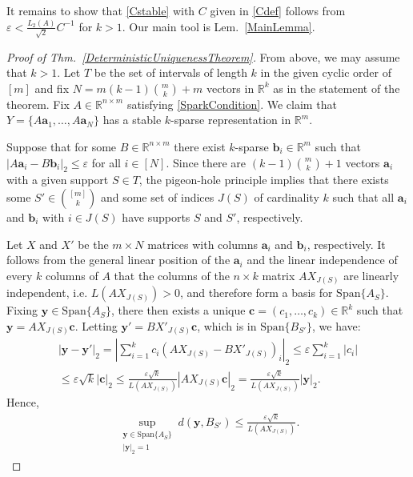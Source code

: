 \documentclass[journal, twocolumn]{IEEEtran}
\begin{document}
It remains to show that \eqref{Cstable} with $C$ given in \eqref{Cdef} follows from $\varepsilon < \frac{L_2(A)}{\sqrt{2}}C^{-1}$ for $k > 1$. Our main tool is Lem.~\ref{MainLemma}.

\begin{proof}[Proof of Thm.~\ref{DeterministicUniquenessTheorem}]
From above, we may assume that $k > 1$. Let $T$ be the set of intervals of length $k$ in the given cyclic order of $[m]$ and fix $N = m(k-1){m \choose k}+m$ vectors in $\mathbb{R}^k$ as in the statement of the theorem. Fix $A \in \mathbb{R}^{n \times m}$ satisfying \eqref{SparkCondition}. We claim that $Y = \{A\mathbf{a}_1, \ldots, A\mathbf{a}_N\}$ has a stable $k$-sparse representation in $\mathbb{R}^m$. 

Suppose that for some $B \in \mathbb{R}^{n \times m}$ there exist $k$-sparse $\mathbf{b}_i \in \mathbb{R}^m$ such that $|A\mathbf{a}_i - B\mathbf{b}_i|_2 \leq \varepsilon$ for all $i \in [N]$. Since there are $(k-1){m \choose k}+1$ vectors $\mathbf{a}_i$ with a given support $S \in T$, the pigeon-hole principle implies that there exists some $S' \in {[m] \choose k}$ and some set of indices $J(S)$ of cardinality $k$ such that all $\mathbf{a}_i$ and $\mathbf{b}_i$ with $i \in J(S)$ have supports $S$ and $S'$, respectively.

Let $X$ and $X'$ be the $m \times N$ matrices with columns $\mathbf{a}_i$ and $\mathbf{b}_i$, respectively. It follows from the general linear position of the $\mathbf{a}_i$ and the linear independence of every $k$ columns of $A$ that the columns of the $n \times k$ matrix $AX_{J(S)}$ are linearly independent, i.e. $L(AX_{J(S)}) > 0$, and therefore form a basis for $\text{Span}\{A_{S}\}$. Fixing $\mathbf{y} \in \text{Span}\{A_{S}\}$, there then exists a unique $\mathbf{c} = (c_1, \ldots, c_k) \in \mathbb{R}^k$ such that $\mathbf{y} = AX_{J(S)}\mathbf{c}$. Letting $\mathbf{y'} = BX'_{J(S)}\mathbf{c}$, which is in $\text{Span}\{B_{S'}\}$, we have:
\begin{align*}
|\mathbf{y} - \mathbf{y'}|_2 
= |\sum_{i=1}^k c_i(AX_{J(S)} - BX'_{J(S)})_i|_2 
\leq \varepsilon \sum_{i=1}^k |c_i| \\
\leq \varepsilon \sqrt{k}  |\mathbf{c}|_2 
\leq \frac{\varepsilon \sqrt{k}}{L(AX_{J(S)})} |AX_{J(S)}\mathbf{c}|_2 
= \frac{\varepsilon \sqrt{k}}{L(AX_{J(S)})} |\mathbf{y}|_2.
\end{align*}
Hence,
\begin{align}\label{ABSubspaceDistance}
\sup_{ \substack{ \mathbf{y} \in \text{Span}\{A_{S}\} \\ |\mathbf{y}|_2 = 1} } d(\mathbf{y}, B_{S'}) \leq \frac{\varepsilon\sqrt{k}}{L(AX_{J(S)})}.
\end{align}


\end{proof}
\end{document}
